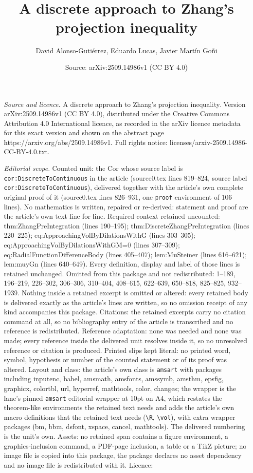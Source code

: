 \documentclass[10pt,a4paper]{amsart}
\title[A discrete approach to Zhang's projection inequality]{A discrete approach to Zhang's projection inequality}
\author{David Alonso-Guti\'errez, Eduardo Lucas, Javier Mart\'in Go\~ni}
\date{Source: arXiv:2509.14986v1 (CC BY 4.0)}
\begin{document}
\maketitle

\noindent\emph{Source and licence.} A discrete approach to Zhang's projection inequality. Version arXiv:2509.14986v1 (CC BY 4.0), distributed under the Creative Commons Attribution 4.0 International licence, as recorded in the arXiv licence metadata for this exact version and shown on the abstract page https://arxiv.org/abs/2509.14986v1. Full rights notice: licenses/arxiv-2509.14986-CC-BY-4.0.txt.\par\smallskip

\noindent\textit{Editorial scope.} Counted unit: the Cor whose source label is \texttt{cor:DiscreteToContinuous} in the article (source0.tex lines 819--824, source label \texttt{cor:DiscreteToContinuous}), delivered together with the article's own complete original proof of it (source0.tex lines 826--931, one \texttt{proof} environment of 106 lines). No mathematics is written, repaired or re-derived: statement and proof are the article's own text line for line. Required context retained uncounted: thm:ZhangPreIntegration (lines 190--195); thm:DiscreteZhangPreIntegration (lines 220--225); eq:ApproachingVolByDilationsWithG (lines 303--305); eq:ApproachingVolByDilationsWithGM=0 (lines 307--309); eq:RadialFunctionDifferenceBody (lines 405--407); lem:MuSteiner (lines 616--621); lem:muyGn (lines 640--649). Every definition, display and label of those lines is retained unchanged. Omitted from this package and not redistributed: 1--189, 196--219, 226--302, 306--306, 310--404, 408--615, 622--639, 650--818, 825--825, 932--1939. Nothing inside a retained excerpt is omitted or altered: every retained body is delivered exactly as the article's lines are written, so no omission receipt of any kind accompanies this package. Citations: the retained excerpts carry no citation command at all, so no bibliography entry of the article is transcribed and no reference is redistributed. Reference adaptation: none was needed and none was made; every reference inside the delivered unit resolves inside it, so no unresolved reference or citation is produced. Printed slips kept literal: no printed word, symbol, hypothesis or number of the counted statement or of its proof was altered. Layout and class: the article's own class is \texttt{amsart} with packages including inputenc, babel, amsmath, amsfonts, amssymb, amsthm, epsfig, graphicx, colortbl, url, hyperref, mathtools, color, changes; the wrapper is the lane's pinned \texttt{amsart} editorial wrapper at 10pt on A4, which restates the theorem-like environments the retained text needs and adds the article's own macro definitions that the retained text needs (\texttt{\textbackslash R}, \texttt{\textbackslash vol}), with extra wrapper packages (bm, bbm, dsfont, xspace, cancel, mathtools). The delivered numbering is the unit's own. Assets: no retained span contains a figure environment, a graphics-inclusion command, a PDF-page inclusion, a table or a TikZ picture; no image file is copied into this package, the package declares no asset dependency and no image file is redistributed with it. Licence: 
\end{document}
